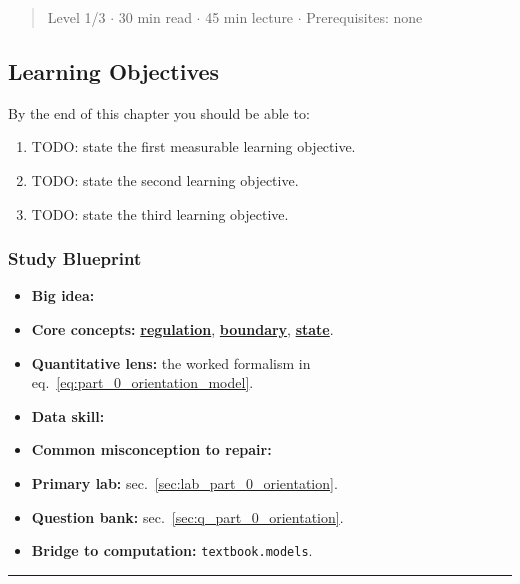 \documentclass[
]{article}
\newcounter{none} %
\providecommand{\tightlist}{%
  \setlength{\itemsep}{0pt}\setlength{\parskip}{0pt}}
\theoremstyle{plain}
\theoremstyle{definition}
\begin{document}
\begin{quote}
Level 1/3 \texorpdfstring{\ensuremath{\cdot}}{.} 30 min read \texorpdfstring{\ensuremath{\cdot}}{.} 45 min lecture \texorpdfstring{\ensuremath{\cdot}}{.} Prerequisites: none
\end{quote}

\subsection{Learning Objectives}\label{learning-objectives}

By the end of this chapter you should be able to:

\begin{enumerate}
\def\labelenumi{\arabic{enumi}.}
\item
  TODO: state the first measurable learning objective.
\item
  TODO: state the second learning objective.
\item
  TODO: state the third learning objective.
\end{enumerate}

\subsubsection{Study Blueprint}\label{study-blueprint}

\begin{itemize}
\tightlist
\item
  \textbf{Big idea:}
\item
  \textbf{Core concepts:} \hyperref[gl:regulation]{\textbf{regulation}},
  \hyperref[gl:boundary]{\textbf{boundary}},
  \hyperref[gl:state]{\textbf{state}}.
\item
  \textbf{Quantitative lens:} the worked formalism in
  eq.~\ref{eq:part_0_orientation_model}.
\item
  \textbf{Data skill:}
\item
  \textbf{Common misconception to repair:}
\item
  \textbf{Primary lab:} sec.~\ref{sec:lab_part_0_orientation}.
\item
  \textbf{Question bank:} sec.~\ref{sec:q_part_0_orientation}.
\item
  \textbf{Bridge to computation:} \texttt{textbook.models}.
\end{itemize}

\begin{center}\rule{0.5\linewidth}{0.5pt}\end{center}
\end{document}

